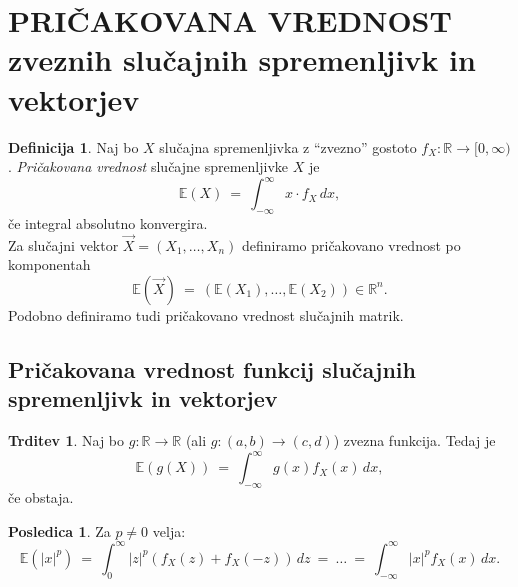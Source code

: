 \documentclass[11pt]{article}
\newcommand{\E}{\mathbb{E}}
\newcommand{\R}{\mathbb{R}}
\newcommand{\1}{\mathbbm{1}}
\theoremstyle{definition}
\newtheorem{definicija}{Definicija}[section]
\theoremstyle{definition}
\newtheorem{trditev}{Trditev}[section]
\theoremstyle{definition}
\newtheorem*{posledica}{Posledica}
\begin{document}
\pagebreak


\section{PRIČAKOVANA VREDNOST \\zveznih slučajnih spremenljivk in vektorjev}
\vspace{0.5cm}

\begin{definicija}

Naj bo $X$ slučajna spremenljivka z ``zvezno'' gostoto $f_X: \R \rightarrow [0, \infty)$. \textit{Pričakovana vrednost} slučajne spremenljivke $X$ je
$$\E(X) ~=~ \int_{-\infty}^{\infty} x \cdot f_X\,dx,$$
če integral absolutno konvergira. \\

Za slučajni vektor $\vec{X} = (X_1, \ldots, X_n)$ definiramo pričakovano vrednost po komponentah
$$\E(\vec{X}) ~=~ (\E(X_1), \ldots, \E(X_2)) \in \R^n.$$
Podobno definiramo tudi pričakovano vrednost slučajnih matrik.

\end{definicija}
\vspace{0.5cm}


\subsection{Pričakovana vrednost funkcij slučajnih spremenljivk in vektorjev}
\vspace{0.5cm}

\begin{trditev}

Naj bo $g: \R \rightarrow \R$ (ali $g:(a, b) \rightarrow (c, d)$) zvezna funkcija. Tedaj je
$$\E(g(X)) ~=~ \int_{-\infty}^{\infty} g(x) f_X(x)\,dx,$$
če obstaja.

\end{trditev}
\vspace{0.5cm}

\begin{posledica}

Za $p \neq 0$ velja:
$$\E(|x|^p) ~=~ \int_0^{\infty} |z|^p (f_X(z) + f_X(-z))\,dz ~=~ \ldots ~=~ \int_{-\infty}^{\infty} |x|^p f_X(x)\,dx.$$

\end{posledica}
\vspace{0.5cm}
\end{document}

